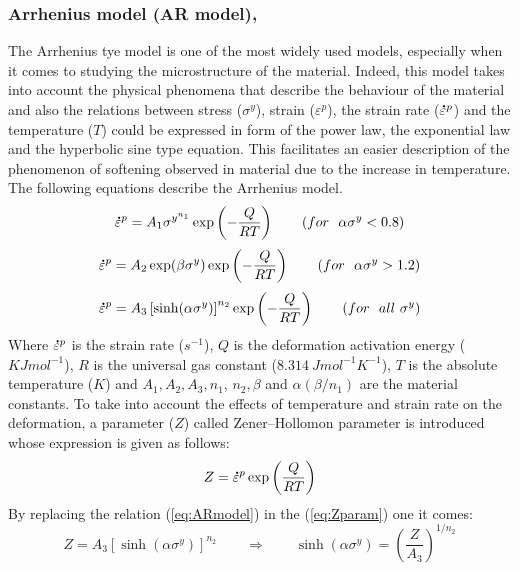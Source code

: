 \documentclass[twoside,english,1p,final,sort&compress]{elsarticle}
\theoremstyle{plain}
\newcommand{\mdot}[1]{\accentset{\mbox{\bfseries .}}{#1}}
\begin{document}
\FloatBarrier
\subsubsection{Arrhenius model (AR model), \label{sec:ARmodel}}
The Arrhenius tye model is one of the most widely used models, especially when it comes to studying the microstructure of the material. Indeed, this model takes into account the physical phenomena that describe the behaviour of the material and also the relations between stress ($\sigma^y$), strain ($\varepsilon^p$), the strain rate ($\mdot{\varepsilon}^p$) and the temperature ($T$) could be expressed in form of the power law, the exponential law and the hyperbolic sine type equation. This facilitates an easier description of the phenomenon of softening observed in material due to the increase in temperature. The following equations describe the Arrhenius model.
\begin{equation}
\label{eq:ARmodel1}
\mdot{\varepsilon}^p = A_1\sigma^{y^{n_1}}\exp\left(-\frac{Q}{RT}\right) \qquad (for ~~\alpha\sigma^y < 0.8)
\end{equation}
\begin{equation}
\label{eq:ARmodel2}
\mdot{\varepsilon}^p = A_2\exp(\beta\sigma^y)\exp\left(-\frac{Q}{RT}\right) \qquad (for ~~\alpha\sigma^y > 1.2)
\end{equation}
\begin{equation}
\label{eq:ARmodel}
\mdot{\varepsilon}^p = A_3\left[\sinh(\alpha\sigma^y)\right]^{n_2}\exp\left(-\frac{Q}{RT}\right) \qquad (for ~~all\ \sigma^y)
\end{equation}
Where $\mdot{\varepsilon}^p$ is the strain rate ($s^{-1}$), $Q$ is the deformation activation energy ($KJmol^{-1}$), $R$ is the universal gas constant ($8.314\ J mol^{-1} K^{-1}$), $T$ is the absolute temperature ($K$) and $A_1, A_2, A_3, n_1$, $n_2, \beta$ and $\alpha(\beta/n_1)$ are the material constants. To take into account the effects of temperature and strain rate on the deformation, a parameter ($Z$) called Zener--Hollomon parameter is introduced whose expression is given as follows:
\begin{equation}
\label{eq:Zparam}
Z = \mdot{\varepsilon}^p\exp\left(\frac{Q}{RT}\right)
\end{equation}
By replacing the relation (\ref{eq:ARmodel}) in the (\ref{eq:Zparam}) one it comes:
\begin{equation}
\label{eq:Zparam1}
Z = A_3\left[\sinh(\alpha\sigma^y)\right]^{n_2} \qquad \Rightarrow \qquad \sinh(\alpha\sigma^y) = \left(\frac{Z}{A_3}\right)^{1/n_2}
\end{equation}
\end{document}
